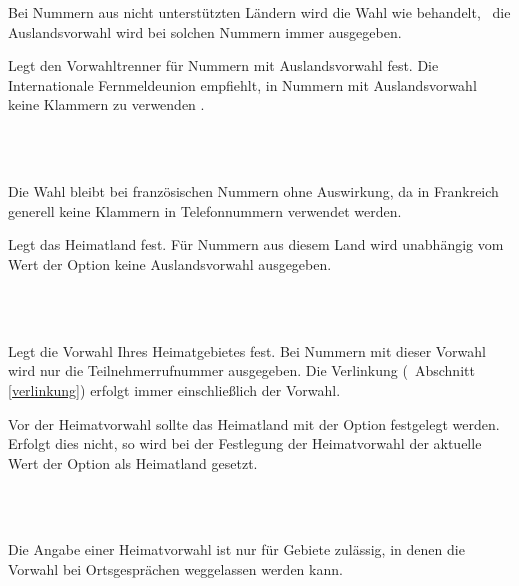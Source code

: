 \documentclass[numbers=noenddot]{scrreprt}
\newcommand*{\vglAbschnitt}[1]{(\cf\ Abschnitt \ref{#1})}
\begin{document}
\begin{Befehlsliste}
Bei Nummern aus nicht unterstützten Ländern wird die Wahl
wie
 behandelt, \ie\ die Auslandsvorwahl wird bei solchen Nummern immer ausgegeben.

Legt den Vorwahltrenner für Nummern mit Auslandsvorwahl fest. Die Internationale Fernmeldeunion empfiehlt, in Nummern mit Auslandsvorwahl keine Klammern zu verwenden \cite[3]{ITU-123}.

\begin{sidebyside}
   \\
   \\
\end{sidebyside}
Die Wahl
bleibt bei französischen Nummern ohne Auswirkung, da in Frankreich generell keine Klammern in Telefonnummern verwendet werden.

Legt das Heimatland fest. Für Nummern aus diesem Land wird unabhängig vom Wert der Option  keine Auslandsvorwahl ausgegeben.
\begin{sidebyside}
   \\
   \\
\end{sidebyside}

Legt die Vorwahl Ihres Heimatgebietes fest. Bei Nummern mit dieser Vorwahl wird nur die Teilnehmerrufnummer ausgegeben. Die Verlinkung
\vglAbschnitt{verlinkung}
erfolgt immer einschließlich der Vorwahl.

Vor der Heimatvorwahl sollte das Heimatland mit der Option  festgelegt werden. Erfolgt dies nicht, so wird bei der Festlegung der Heimatvorwahl der aktuelle Wert der Option  als Heimatland gesetzt.
\begin{sidebyside}
   \\
   \\
\end{sidebyside}
Die Angabe einer Heimatvorwahl ist nur für Gebiete zulässig, in denen die Vorwahl bei Ortsgesprächen weggelassen werden kann.
\end{Befehlsliste}
\end{document}
